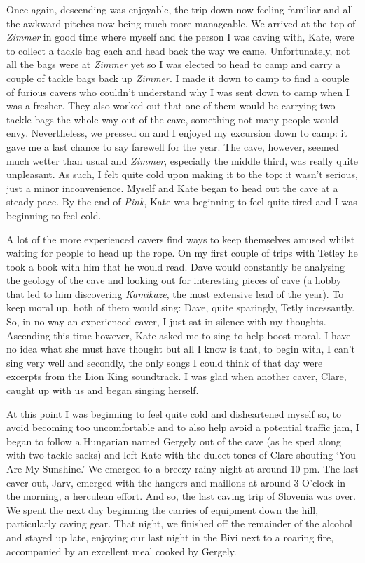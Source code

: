 Once again, descending was enjoyable, the trip down now feeling familiar
and all the awkward pitches now being much more manageable. We arrived
at the top of \emph{Zimmer} in good time where myself and the person I
was caving with, Kate, were to collect a tackle bag each and head back
the way we came. Unfortunately, not all the bags were at \emph{Zimmer}
yet so I was elected to head to camp and carry a couple of tackle bags
back up \emph{Zimmer}. I made it down to camp to find a couple of
furious cavers who couldn't understand why I was sent down to camp when
I was a fresher. They also worked out that one of them would be carrying
two tackle bags the whole way out of the cave, something not many people
would envy. Nevertheless, we pressed on and I enjoyed my excursion down
to camp: it gave me a last chance to say farewell for the year. The
cave, however, seemed much wetter than usual and \emph{Zimmer},
especially the middle third, was really quite unpleasant. As such, I
felt quite cold upon making it to the top: it wasn't serious, just a
minor inconvenience. Myself and Kate began to head out the cave at a
steady pace. By the end of \emph{Pink}, Kate was beginning to feel quite
tired and I was beginning to feel cold.

A lot of the more experienced cavers find ways to keep themselves amused
whilst waiting for people to head up the rope. On my first couple of
trips with Tetley he took a book with him that he would read. Dave would
constantly be analysing the geology of the cave and looking out for
interesting pieces of cave (a hobby that led to him discovering
\emph{Kamikaze}, the most extensive lead of the year). To keep moral up,
both of them would sing: Dave, quite sparingly, Tetly incessantly. So,
in no way an experienced caver, I just sat in silence with my thoughts.
Ascending this time however, Kate asked me to sing to help boost moral.
I have no idea what she must have thought but all I know is that, to
begin with, I can't sing very well and secondly, the only songs I could
think of that day were excerpts from the Lion King soundtrack. I was
glad when another caver, Clare, caught up with us and began singing
herself.

At this point I was beginning to feel quite cold and disheartened myself
so, to avoid becoming too uncomfortable and to also help avoid a
potential traffic jam, I began to follow a Hungarian named Gergely out
of the cave (as he sped along with two tackle sacks) and left Kate with
the dulcet tones of Clare shouting `You Are My Sunshine.' We emerged to
a breezy rainy night at around 10 pm. The last caver out, Jarv, emerged
with the hangers and maillons at around 3 O'clock in the morning, a
herculean effort. And so, the last caving trip of Slovenia was over. We
spent the next day beginning the carries of equipment down the hill,
particularly caving gear. That night, we finished off the remainder of
the alcohol and stayed up late, enjoying our last night in the Bivi next
to a roaring fire, accompanied by an excellent meal cooked by Gergely.


